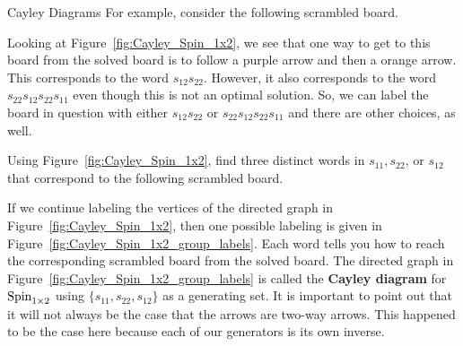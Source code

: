 \begin{section}{Cayley Diagrams}
For example, consider the following scrambled board.
\begin{center}
\end{center}
Looking at Figure~\ref{fig:Cayley_Spin_1x2}, we see that one way to get to this board from the solved board is to follow a {\color{cb-purple}purple} arrow and then a {\color{cb-orange}orange}  arrow.  This corresponds to the word $s_{12}s_{22}$. However, it also corresponds to the word $s_{22}s_{12}s_{22}s_{11}$ even though this is not an optimal solution.  So, we can label the board in question with either $s_{12}s_{22}$ or $s_{22}s_{12}s_{22}s_{11}$ and there are other choices, as well.

\begin{problem}
Using Figure~\ref{fig:Cayley_Spin_1x2}, find three distinct words in $s_{11}, s_{22}$, or $s_{12}$ that correspond to the following scrambled board.
\begin{center}
\end{center}
\end{problem}

If we continue labeling the vertices of the directed graph in Figure~\ref{fig:Cayley_Spin_1x2}, then one possible labeling is given in Figure~\ref{fig:Cayley_Spin_1x2_group_labels}. Each word tells you how to reach the corresponding scrambled board from the solved board. The directed graph in Figure~\ref{fig:Cayley_Spin_1x2_group_labels} is called the \textbf{Cayley diagram} for $\operatorname{Spin}_{1\times 2}$ using $\{s_{11},s_{22},s_{12}\}$ as a generating set. It is important to point out that it will not always be the case that the arrows are two-way arrows. This happened to be the case here because each of our generators is its own inverse.


\end{section}
